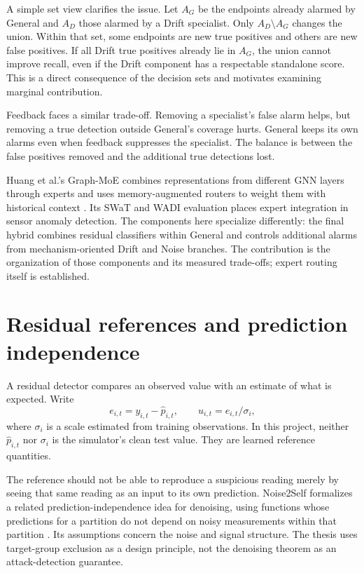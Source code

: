 A simple set view clarifies the issue. Let $A_G$ be the endpoints already alarmed by General and $A_D$ those alarmed by a Drift specialist. Only $A_D\setminus A_G$ changes the union. Within that set, some endpoints are new true positives and others are new false positives. If all Drift true positives already lie in $A_G$, the union cannot improve recall, even if the Drift component has a respectable standalone score. This is a direct consequence of the decision sets and motivates examining marginal contribution.

Feedback faces a similar trade-off. Removing a specialist's false alarm helps, but removing a true detection outside General's coverage hurts. General keeps its own alarms even when feedback suppresses the specialist. The balance is between the false positives removed and the additional true detections lost.

Huang et al.'s Graph-MoE combines representations from different GNN layers through experts and uses memory-augmented routers to weight them with historical context \cite{graphmoe2025}. Its SWaT and WADI evaluation places expert integration in sensor anomaly detection. The components here specialize differently: the final hybrid combines residual classifiers within General and controls additional alarms from mechanism-oriented Drift and Noise branches. The contribution is the organization of those components and its measured trade-offs; expert routing itself is established.

\section{Residual references and prediction independence}
A residual detector compares an observed value with an estimate of what is expected. Write
\begin{equation}
 e_{i,t}=y_{i,t}-\widehat p_{i,t},\qquad
 u_{i,t}=e_{i,t}/\sigma_i,
 \label{eq:residual}
\end{equation}
where $\sigma_i$ is a scale estimated from training observations. In this project, neither $\widehat p_{i,t}$ nor $\sigma_i$ is the simulator's clean test value. They are learned reference quantities.

The reference should not be able to reproduce a suspicious reading merely by seeing that same reading as an input to its own prediction. Noise2Self formalizes a related prediction-independence idea for denoising, using functions whose predictions for a partition do not depend on noisy measurements within that partition \cite{noise2self}. Its assumptions concern the noise and signal structure. The thesis uses target-group exclusion as a design principle, not the denoising theorem as an attack-detection guarantee.

